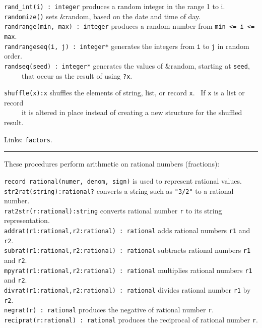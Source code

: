 \texttt{rand\_int(i) : integer} produces a random integer in the range 1
to i.\\
\texttt{randomize()} sets \&random, based on the
date and time of day. \\
\texttt{randrange(min, max) : integer} produces a random number from
\texttt{min {\textless}= i {\textless}= max}.\\
\texttt{randrangeseq(i, j) : integer*} generates the integers from
\texttt{i} to \texttt{j} in random order.\\
\texttt{randseq(seed) : integer*} generates the values of \&random,
starting at \texttt{seed},\\
 \ \ \ \ \ that occur as the result of using \texttt{?x}.

\texttt{shuffle(x):x} shuffles the elements of string, list, or record
\texttt{x}. \ If \texttt{x} is a list or record\\
 \ \ \ \ \ it is altered in place instead of creating a new structure for
the shuffled result.

Links: \texttt{factors}.

\vspace{0.25cm}\hrule{}

These procedures perform arithmetic on rational
numbers (fractions):

\texttt{record rational(numer, denom, sign)} is used to represent
rational values.\\
\texttt{str2rat(string):rational?} converts a string such as
\texttt{"3/2"} to a rational
number.\\
\texttt{rat2str(r:rational):string} converts rational number \texttt{r}
to its string representation.\\
\texttt{addrat(r1:rational,r2:rational) : rational} adds rational
numbers \texttt{r1} and \texttt{r2}.\\
\texttt{subrat(r1:rational,r2:rational) : rational} subtracts rational
numbers \texttt{r1} and \texttt{r2}.\\
\texttt{mpyrat(r1:rational,r2:rational) : rational} multiplies rational
numbers \texttt{r1} and \texttt{r2}.\\
\texttt{divrat(r1:rational,r2:rational) : rational} divides rational
number \texttt{r1} by \texttt{r2}.\\
\texttt{negrat(r) : rational} produces the negative of rational number
\texttt{r}.\\
\texttt{reciprat(r:rational) : rational} produces the reciprocal of
rational number \texttt{r}.

